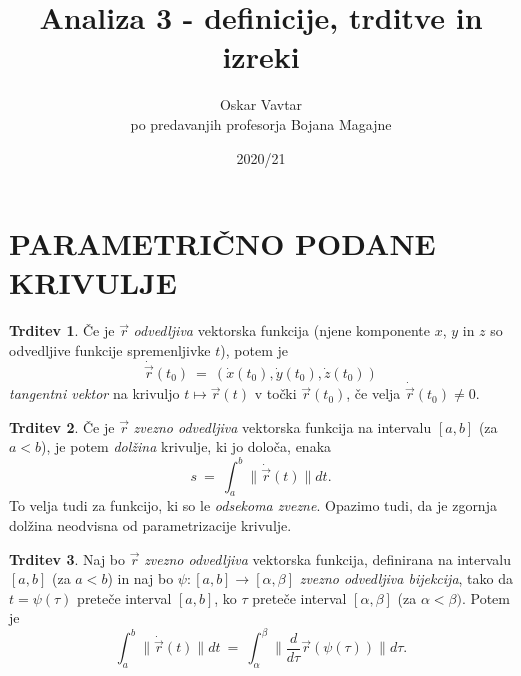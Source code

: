 \documentclass[11pt]{article}
\title{Analiza 3 - definicije, trditve in izreki}
\author{Oskar Vavtar \\
po predavanjih profesorja Bojana Magajne}
\date{2020/21}
\theoremstyle{definition}
\theoremstyle{definition}
\newtheorem{trditev}{Trditev}[section]
\theoremstyle{definition}
\begin{document}
\maketitle
\pagebreak
\tableofcontents
\pagebreak


\section{PARAMETRIČNO PODANE KRIVULJE}
\vspace{0.5cm}	

\begin{trditev}

Če je $\vec{r}$ \textit{odvedljiva} vektorska funkcija (njene komponente $x$, $y$ in $z$ so odvedljive funkcije spremenljivke $t$), potem je
$$\dot{\vec{r}}(t_0) ~=~ (\dot{x}(t_0), \dot{y}(t_0), \dot{z}(t_0))$$
\textit{tangentni vektor} na krivuljo $t \mapsto \vec{r}(t)$ v točki $\vec{r}(t_0)$, če velja $\dot{\vec{r}}(t_0) \neq 0$.
	
\end{trditev}
\vspace{0.5cm}

\begin{trditev}

Če je $\vec{r}$ \textit{zvezno odvedljiva} vektorska funkcija na intervalu $[a, b]$ (za	$a < b$), je potem \textit{dolžina} krivulje, ki jo določa, enaka
$$s ~=~ \int_{a}^{b} \| \dot{\vec{r}}(t) \| dt.$$
To velja tudi za funkcijo, ki so le \textit{odsekoma zvezne}. Opazimo tudi, da je zgornja dolžina neodvisna od parametrizacije krivulje.	

\end{trditev}
\vspace{0.5cm}

\begin{trditev}

Naj bo $\vec{r}$ \textit{zvezno odvedljiva} vektorska funkcija, definirana na intervalu $[a, b]$ (za $a < b$) in naj bo $\psi: [a, b] \rightarrow [\alpha, \beta]$ \textit{zvezno odvedljiva bijekcija}, tako da $t = \psi(\tau)$ preteče interval $[a, b]$, ko $\tau$ preteče interval $[\alpha, \beta]$ (za $\alpha < \beta)$. Potem je
$$\int_{a}^{b} \| \dot{\vec{r}}(t) \| dt ~=~ \int_{\alpha}^{\beta} \| \frac{d}{d \tau} \vec{r}(\psi(\tau)) \| d\tau. $$

\end{trditev}
\vspace{0.5cm}
\end{document}
